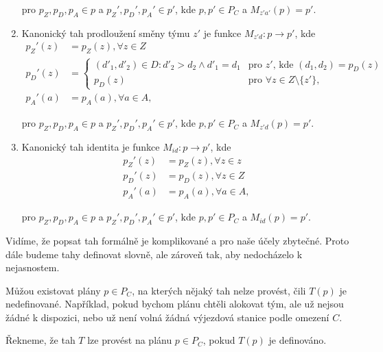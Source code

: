 \begin{definice}
\begin{enumerate}
      pro $p_Z, p_D, p_A \in p$ a $p_Z', p_D', p_A' \in p'$, kde $p, p' \in P_C$ a $M_{z'a'}(p) = p'$.

    \item
      Kanonický tah prodloužení směny týmu $z'$ je funkce $M_{z'd} : p \rightarrow p'$, kde
      \begin{align*}
        p_Z'(z) &= p_Z(z), \forall z \in Z \\
        p_D'(z) &=
          \begin{cases}
            (d'_1, d'_2) \in D \colon d'_2 > d_2 \land d'_1 = d_1  & \text{pro $z'$, kde $(d_1, d_2) = p_{D}(z)$} \\
            p_D(z) & \text{pro $\forall z \in Z \setminus \{ z' \}$},
          \end{cases}
          \\
        p_A'(a) &= p_A(a), \forall a \in A,
      \end{align*}

      pro $p_Z, p_D, p_A \in p$ a $p_Z', p_D', p_A' \in p'$, kde $p, p' \in P_C$ a $M_{z'd}(p) = p'$.

    \item
      Kanonický tah identita je funkce $M_{id}: p \rightarrow p'$, kde
      \begin{align*}
        p_Z'(z) &= p_Z(z), \forall z \in z \\
        p_D'(z) &= p_D(z), \forall z \in Z \\
        p_A'(a) &= p_A(a), \forall a \in A,
      \end{align*}

      pro $p_Z, p_D, p_A \in p$ a $p_Z', p_D', p_A' \in p'$, kde $p, p' \in P_C$ a $M_{id}(p) = p'$.
  \end{enumerate}

\end{definice}

Vidíme, že popsat tah formálně je komplikované a pro naše účely zbytečné.
Proto dále budeme tahy definovat slovně, ale zároveň tak, aby nedocházelo k nejasnostem.

Můžou existovat plány $p \in P_C$, na kterých nějaký tah nelze provést, čili $T(p)$ je nedefinované.
Například, pokud bychom plánu chtěli alokovat tým, ale už nejsou žádné k dispozici, nebo už není volná žádná výjezdová stanice podle omezení $C$.

\begin{definice}
  Řekneme, že tah $T$ lze provést na plánu $p \in P_C$, pokud $T(p)$ je definováno.
\end{definice}

